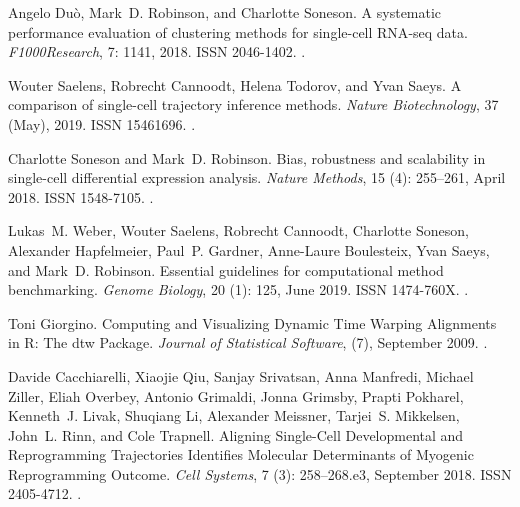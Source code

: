 \documentclass[10pt, a4paper]{article}
\begin{document}
\begin{thebibliography}{59}
	Angelo Du{\`o}, Mark~D. Robinson, and Charlotte Soneson.
	\newblock A systematic performance evaluation of clustering methods for
	single-cell {{RNA}}-seq data.
	\newblock \emph{F1000Research}, 7: 1141, 2018.
	\newblock ISSN 2046-1402.
	\newblock {}.
	
	Wouter Saelens, Robrecht Cannoodt, Helena Todorov, and Yvan Saeys.
	\newblock A comparison of single-cell trajectory inference methods.
	\newblock \emph{Nature Biotechnology}, 37 (May), 2019.
	\newblock ISSN 15461696.
	\newblock {}.
	
	Charlotte Soneson and Mark~D. Robinson.
	\newblock Bias, robustness and scalability in single-cell differential
	expression analysis.
	\newblock \emph{Nature Methods}, 15 (4): 255--261, April
	2018{}.
	\newblock ISSN 1548-7105.
	\newblock {}.
	
	Lukas~M. Weber, Wouter Saelens, Robrecht Cannoodt, Charlotte Soneson, Alexander
	Hapfelmeier, Paul~P. Gardner, Anne-Laure Boulesteix, Yvan Saeys, and Mark~D.
	Robinson.
	\newblock Essential guidelines for computational method benchmarking.
	\newblock \emph{Genome Biology}, 20 (1): 125, June 2019.
	\newblock ISSN 1474-760X.
	\newblock {}.
	
	Toni Giorgino.
	\newblock Computing and {{Visualizing Dynamic Time Warping Alignments}} in
	{{R}}: {{The}} dtw {{Package}}.
	\newblock \emph{Journal of Statistical Software},  (7), September
	2009.
	\newblock {}.
	
	Davide Cacchiarelli, Xiaojie Qiu, Sanjay Srivatsan, Anna Manfredi, Michael
	Ziller, Eliah Overbey, Antonio Grimaldi, Jonna Grimsby, Prapti Pokharel,
	Kenneth~J. Livak, Shuqiang Li, Alexander Meissner, Tarjei~S. Mikkelsen,
	John~L. Rinn, and Cole Trapnell.
	\newblock Aligning {{Single}}-{{Cell Developmental}} and {{Reprogramming
			Trajectories Identifies Molecular Determinants}} of {{Myogenic Reprogramming
			Outcome}}.
	\newblock \emph{Cell Systems}, 7 (3): 258--268.e3, September
	2018.
	\newblock ISSN 2405-4712.
	\newblock {}.
	

\end{thebibliography}
\end{document}
